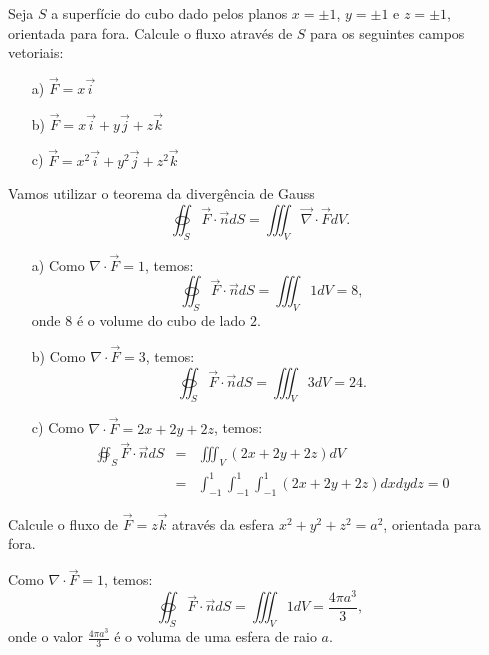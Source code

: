 \begin{exeresol} Seja $S$ a superfície do cubo dado pelos planos $x=\pm 1$, $y=\pm 1$ e $z=\pm 1$, orientada para fora. Calcule o fluxo através de $S$ para os seguintes campos vetoriais:
\begin{itemize}
 \item[a)]$\vec{F}=x\vec{i}$
 \item[b)]$\vec{F}=x\vec{i}+y\vec{j}+z\vec{k}$
 \item[c)]$\vec{F}=x^2\vec{i}+y^2\vec{j}+z^2\vec{k}$
 \end{itemize}
\end{exeresol}
\begin{resol}
Vamos utilizar o teorema da divergência de Gauss
$$
\oiint_S \vec{F}\cdot \vec{n} dS=\iiint_V \vec{\nabla}\cdot \vec{F} dV.
$$
\begin{itemize}
 \item[a)] Como $\nabla\cdot \vec{F}=1$, temos: 
$$
\oiint_S \vec{F}\cdot \vec{n} dS=\iiint_V 1 dV=8,
$$
 onde $8$ é o volume do cubo de lado $2$.
 \item[b)] Como $\nabla\cdot \vec{F}=3$, temos: 
$$
\oiint_S \vec{F}\cdot \vec{n} dS=\iiint_V 3 dV=24.
$$
 \item[c)] Como $\nabla\cdot \vec{F}=2x+2y+2z$, temos: 
\begin{eqnarray*}
\oiint_S \vec{F}\cdot \vec{n} dS &=& \iiint_V (2x+2y+2z) dV\\
&=&\int_{-1}^1\int_{-1}^1\int_{-1}^1(2x+2y+2z)dxdydz = 0
\end{eqnarray*}

 \end{itemize}


\end{resol}

\begin{exeresol} Calcule o fluxo de $\vec{F}=z\vec{k}$ através da esfera $x^2+y^2+z^2= a^2$, orientada para fora. \end{exeresol}
\begin{resol}
Como $\nabla\cdot \vec{F}=1$, temos: 
$$
\oiint_S \vec{F}\cdot \vec{n} dS=\iiint_V 1 dV=\frac{4\pi a^3}{3},
$$
onde o valor $\frac{4\pi a^3}{3}$ é o voluma de uma esfera de raio $a$.
\end{resol}

